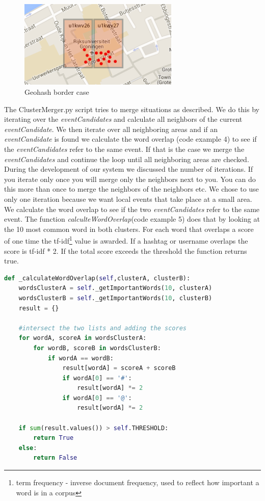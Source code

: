\documentclass[
10pt, %
a4paper, %
oneside, %
headinclude,footinclude, %
BCOR5mm, %
]{scrartcl}
\begin{document}
\begin{figure}[htbp] %
   \centering
   \includegraphics[width=3in]{bordercase.png} 
   \caption{Geohash border case}
   \label{Geohash border case}
\end{figure}
The ClusterMerger.py script tries to merge situations as described.  We do this by iterating over the \textit{eventCandidates} and calculate all neighbors of the current \textit{eventCandidate}. We then iterate over all neighboring areas and if an \textit{eventCandidate} is found we calculate the word overlap (code example 4) to see if the \textit{eventCandidates} refer to the same event. If that is the case we merge the \textit{eventCandidates} and continue the loop until all neighboring areas are checked.
\vl
During the development of our system we discussed the number of iterations. If you iterate only once you will merge only the neighbors next to you. You can do this more than once to merge the neighbors of the neighbors etc. We chose to use only one iteration because we want local events that take place at a small area.
\vl
We calculate the word overlap to see if the two \textit{eventCandidates} refer to the same event.  The function \textit{calculteWordOverlap}(code example 5) does that by looking at the 10 most common word in both clusters. For each word that overlaps a score of one time the tf-idf\footnote{term frequency - inverse document frequency, used to reflect how important a word is in a corpus} value is awarded. If a hashtag or username overlaps the score is tf-idf * 2. If the total score exceeds the threshold the function returns true. 

\begin{lstlisting}[language=Python, caption=Calculate word overlap]
def _calculateWordOverlap(self,clusterA, clusterB):      
    wordsClusterA = self._getImportantWords(10, clusterA)
    wordsClusterB = self._getImportantWords(10, clusterB)
    result = {}
    
    #intersect the two lists and adding the scores
    for wordA, scoreA in wordsClusterA:
        for wordB, scoreB in wordsClusterB:
            if wordA == wordB:
                result[wordA] = scoreA + scoreB
                if wordA[0] == '#':
                    result[wordA] *= 2
                if wordA[0] == '@':
                    result[wordA] *= 2

    if sum(result.values()) > self.THRESHOLD:
        return True
    else:
        return False
\end{lstlisting}
\end{document}
